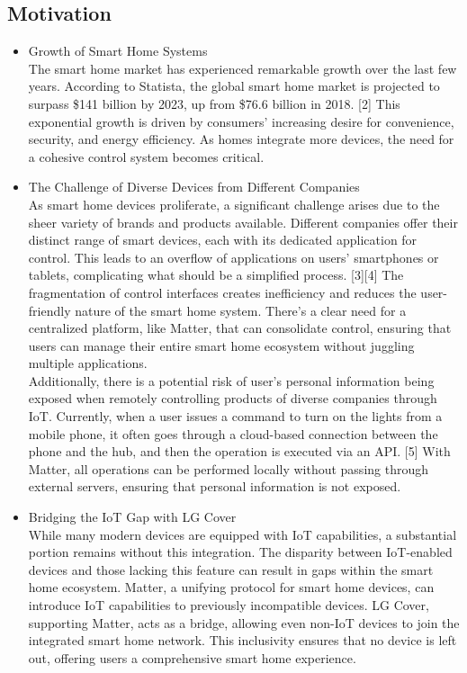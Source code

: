\documentclass[conference]{IEEEtran}
\begin{document}
\subsection{\large{Motivation}}
\begin{itemize}
\item Growth of Smart Home Systems\\
The smart home market has experienced remarkable growth over the last few years. According to Statista, the global smart home market is projected to surpass \$141 billion by 2023, up from \$76.6 billion in 2018. [2] This exponential growth is driven by consumers' increasing desire for convenience, security, and energy efficiency. As homes integrate more devices, the need for a cohesive control system becomes critical.\\
\item The Challenge of Diverse Devices from Different Companies \\
As smart home devices proliferate, a significant challenge arises due to the sheer variety of brands and products available. Different companies offer their distinct range of smart devices, each with its dedicated application for control. This leads to an overflow of applications on users' smartphones or tablets, complicating what should be a simplified process. [3][4] The fragmentation of control interfaces creates inefficiency and reduces the user-friendly nature of the smart home system. There's a clear need for a centralized platform, like Matter, that can consolidate control, ensuring that users can manage their entire smart home ecosystem without juggling multiple applications. \\
Additionally, there is a potential risk of user's personal information being exposed when remotely controlling products of diverse companies through IoT. Currently, when a user issues a command to turn on the lights from a mobile phone, it often goes through a cloud-based connection between the phone and the hub, and then the operation is executed via an API. [5] With Matter, all operations can be performed locally without passing through external servers, ensuring that personal information is not exposed.\\
\item Bridging the IoT Gap with LG Cover\\
While many modern devices are equipped with IoT capabilities, a substantial portion remains without this integration. The disparity between IoT-enabled devices and those lacking this feature can result in gaps within the smart home ecosystem. Matter, a unifying protocol for smart home devices, can introduce IoT capabilities to previously incompatible devices. LG Cover, supporting Matter, acts as a bridge, allowing even non-IoT devices to join the integrated smart home network. This inclusivity ensures that no device is left out, offering users a comprehensive smart home experience.\\
\end{itemize}
\end{document}
